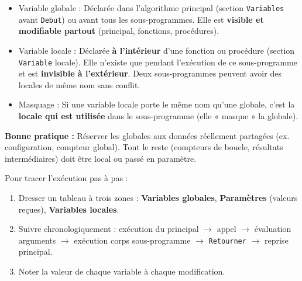 \documentclass[11pt]{article}
\newcommand{\cle}[1]{{\popxbold\color{popdark}#1}}
\begin{document}
\begin{definition}
\begin{itemize}
\item \cle{Variable globale} : Déclarée dans l'algorithme principal (section \texttt{Variables} avant \texttt{Debut}) ou avant tous les sous-programmes. Elle est \textbf{visible et modifiable partout} (principal, fonctions, procédures).
\item \cle{Variable locale} : Déclarée \textbf{à l'intérieur} d'une fonction ou procédure (section \texttt{Variable} locale). Elle n'existe que pendant l'exécution de ce sous-programme et est \textbf{invisible à l'extérieur}. Deux sous-programmes peuvent avoir des locales de même nom sans conflit.
\item \cle{Masquage} : Si une variable locale porte le même nom qu'une globale, c'est la \textbf{locale qui est utilisée} dans le sous-programme (elle « masque » la globale).
\end{itemize}
\textbf{Bonne pratique :} Réserver les globales aux données réellement partagées (ex. configuration, compteur global). Tout le reste (compteurs de boucle, résultats intermédiaires) doit être local ou passé en paramètre.
\end{definition}

\begin{methode}
Pour tracer l'exécution pas à pas :
\begin{enumerate}
\item Dresser un tableau à trois zones : \textbf{Variables globales}, \textbf{Paramètres} (valeurs reçues), \textbf{Variables locales}.
\item Suivre chronologiquement : exécution du principal $\to$ appel $\to$ évaluation arguments $\to$ exécution corps sous-programme $\to$ \texttt{Retourner} $\to$ reprise principal.
\item Noter la valeur de chaque variable à chaque modification.
\end{enumerate}
\end{methode}
\end{document}
